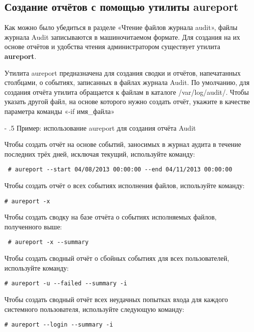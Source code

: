 \documentclass[a4paper,10pt,twoside]{article}
\makeatletter
\renewcommand\paragraph{%
   \@startsection{paragraph}{4}{0mm}%
      {-\baselineskip}%
      {.5\baselineskip}%
      {\normalfont\normalsize\bfseries}}
\makeatother
\begin{document}
\subsection{Создание отчётов с помощью утилиты aureport}
Как можно было убедиться в разделе «Чтение файлов журнала audit», файлы журнала Audit записываются в машиночитаемом формате. Для создания на их основе отчётов и удобства чтения администратором существует утилита \textbf{aureport}.

Утилита aureport предназначена для создания сводки и отчётов, напечатанных столбцами, о событиях, записанных в файлах журнала Audit. По умолчанию, для создания отчёта утилита обращается к файлам в каталоге  /var/log/audit/. Чтобы указать другой файл, на основе которого нужно создать отчёт, укажите в качестве параметра команды «-if имя\_файла»
⁠

\paragraph{Пример: использование aureport для создания отчёта Audit }

Чтобы создать отчёт на основе событий, заносимых в журнал аудита в течение последних трёх дней, исключая текущий, используйте команду:
\begin{verbatim}
 # aureport --start 04/08/2013 00:00:00 --end 04/11/2013 00:00:00
\end{verbatim} 

Чтобы создать отчёт о всех событиях исполнения файлов, используйте команду:
\begin{verbatim}
# aureport -x
\end{verbatim} 

Чтобы создать сводку на базе отчёта о событиях исполняемых файлов, полученного выше:
\begin{verbatim}
 # aureport -x --summary
\end{verbatim} 

Чтобы создать сводный отчёт о сбойных событиях для всех пользователей, используйте команду:
\begin{verbatim}
# aureport -u --failed --summary -i
\end{verbatim} 

Чтобы создать сводный отчёт всех неудачных попытках входа для каждого системного пользователя, используйте следующую команду:
\begin{verbatim}
# aureport --login --summary -i
\end{verbatim} 
\end{document}
